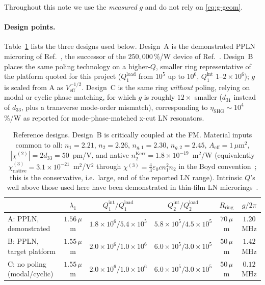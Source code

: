 \documentclass[11pt,a4paper]{article}
\newcommand{\eps}{\varepsilon}
\newcommand{\chitwo}{\chi^{(2)}}
\newcommand{\chithree}{\chi^{(3)}}
\newcommand{\Veff}{V_{\text{eff}}}
\newcommand{\Aeff}{A_{\text{eff}}}
\newcommand{\etanorm}{\eta_{\text{SHG}}}
\begin{document}
Throughout this note we use the \emph{measured} $g$ and do not rely on
\eqref{eq:g-geom}.

\paragraph{Design points.}  Table~\ref{tab:designs} lists the three
designs used below.  Design~A is the demonstrated PPLN microring of Ref.~\cite{Lu2020}, the
successor of the $250{,}000$\,\%/W device of Ref.~\cite{Lu2019}.  Design~B places the same poling technology on a
higher-$Q$, smaller ring representative of the platform quoted for this
project ($Q_1^{\text{load}}$ from $10^5$ up to $10^6$, $Q_1^{\text{int}}$
$1$--$2\times10^6$); $g$ is scaled from A as $\Veff^{-1/2}$.  Design~C is
the same ring \emph{without} poling, relying on modal or cyclic phase
matching, for which $g$ is roughly $12\times$ smaller
($d_{31}$ instead of $d_{33}$, plus a transverse mode-order mismatch),
corresponding to $\etanorm\sim10^4$\,\%/W as reported for
mode-phase-matched x-cut LN resonators.

\begin{table}[H]
\centering
\small
\begin{tabular}{lccccc}
\toprule
 & $\lambda_1$ & $Q_1^{\text{int}}/Q_1^{\text{load}}$
 & $Q_2^{\text{int}}/Q_2^{\text{load}}$ & $R_{\text{ring}}$ & $g/2\pi$ \\
\midrule
A: PPLN, demonstrated \cite{Lu2020} & $1.56\,\mu$m
   & $1.8\!\times\!10^6/5.4\!\times\!10^5$
   & $5.8\!\times\!10^5/4.5\!\times\!10^5$ & $70\,\mu$m & $1.20$ MHz \\
B: PPLN, target platform & $1.55\,\mu$m
   & $2.0\!\times\!10^6/1.0\!\times\!10^6$
   & $6.0\!\times\!10^5/3.0\!\times\!10^5$ & $50\,\mu$m & $1.42$ MHz \\
C: no poling (modal/cyclic) & $1.55\,\mu$m
   & $2.0\!\times\!10^6/1.0\!\times\!10^6$
   & $6.0\!\times\!10^5/3.0\!\times\!10^5$ & $50\,\mu$m & $0.12$ MHz \\
\bottomrule
\end{tabular}
\caption{Reference designs.  Design~B is critically coupled at the FM.
Material inputs common to all: $n_1=2.21$, $n_2=2.26$, $n_{g,1}=2.30$,
$n_{g,2}=2.45$, $\Aeff=1\,\mu$m$^2$, $|\chitwo|=2d_{33}=50$~pm/V, and
native $n_2^{\text{Kerr}}=1.8\times10^{-19}$~m$^2$/W (equivalently
$\chithree_{\text{native}}=3.1\times10^{-21}$~m$^2$/V$^2$ through
$\chithree=\tfrac43\eps_0cn_1^2n_2$ in the Boyd convention~\cite{Boyd};
this is the conservative, i.e.\ large, end of the reported LN range).
Intrinsic $Q$'s well above those used here have been demonstrated in
thin-film LN microrings~\cite{Zhang2017}.}
\label{tab:designs}
\end{table}
\end{document}
